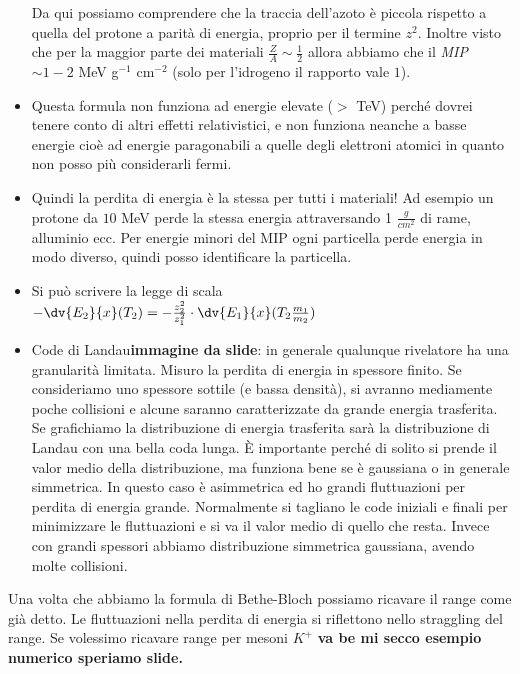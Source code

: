 \begin{itemize}
    Da qui possiamo comprendere che la traccia dell'azoto è piccola rispetto a quella del protone a parità di energia, proprio per il termine $z^2$. Inoltre visto che per la maggior parte dei materiali $\frac Z A\sim \frac12$ allora abbiamo che il \textit{MIP} $\sim1-2$ MeV g$^{-1}$ cm$^{-2}$ (solo per l'idrogeno il rapporto vale $1$).
    \item Questa formula non funziona ad energie elevate ($>$ TeV) perché dovrei tenere conto di altri effetti relativistici, e non funziona neanche a basse energie cioè ad energie paragonabili a quelle degli elettroni atomici in quanto non posso più considerarli fermi. 
    \item Quindi la perdita di energia è la stessa per tutti i materiali! Ad esempio un protone da $10$ MeV perde la stessa energia attraversando 1 $\frac g {cm^2}$ di rame, alluminio ecc. Per energie minori del MIP ogni particella perde energia in modo diverso, quindi posso identificare la particella.
    \item Si può scrivere la legge di scala $-\dv{E_2}{x}(T_2)=-\frac{z_2^2}{z_1^2}\cdot \dv{E_1}{x}(T_2\frac{m_1}{m_2})$
    \item Code di Landau\textbf{immagine da slide}: in generale qualunque rivelatore ha una granularità limitata. Misuro la perdita di energia in spessore finito. Se consideriamo uno spessore sottile (e bassa densità), si avranno mediamente poche collisioni e alcune saranno caratterizzate da grande energia trasferita. Se grafichiamo la distribuzione di energia trasferita sarà la distribuzione di Landau con una bella coda lunga. È importante perché di solito si prende il valor medio della distribuzione, ma funziona bene se è gaussiana o in generale simmetrica. In questo caso è asimmetrica ed ho grandi fluttuazioni per perdita di energia grande. Normalmente si tagliano le code iniziali e finali per minimizzare le fluttuazioni e si va il valor medio di quello che resta. Invece con grandi spessori abbiamo distribuzione simmetrica gaussiana, avendo molte collisioni.
\end{itemize}
Una volta che abbiamo la formula di Bethe-Bloch possiamo ricavare il range come già detto. Le fluttuazioni nella perdita di energia si riflettono nello straggling del range. Se volessimo ricavare range per mesoni $K^+$ \textbf{va be mi secco esempio numerico speriamo slide.}

